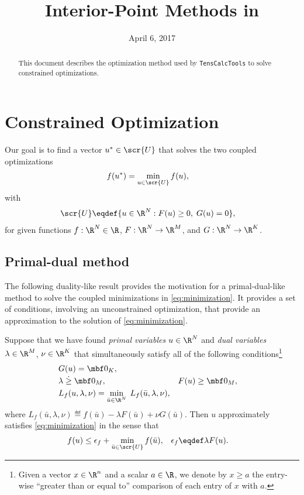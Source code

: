 \documentclass[11pt]{article}
\title{Interior-Point Methods in \TC}
\author{\jph}
\date{April 6, 2017}
\newcommand{\TC}{\texttt{TensCalcTools}}
\begin{document}
                        \maketitle

\begin{abstract}
  This document describes the optimization method used by \TC{} to
  solve constrained optimizations.
\end{abstract}

\section{Constrained Optimization}
\label{sec:ipm-o}

Our goal is to find a vector $u^*\in\scr{U}$ that solves the two coupled
optimizations
\begin{align}\label{eq:minimization}
  f(u^*)&=\min_{u\in\scr{U}} f(u), &
\end{align}
with
\begin{align*}
  \scr{U}&\eqdef\{u\in\R^{N}: F(u)\ge 0,\; G(u)=0\}, 
\end{align*}
for given functions $f:\R^{N}\in\R$, $F:\R^{N}\to\R^{M}$, and $G:\R^{N}\to\R^{K}$.


\subsection{Primal-dual method}

The following duality-like result provides the motivation for a
primal-dual-like method to solve the coupled minimizations in
\eqref{eq:minimization}. It provides a set of
conditions, involving an unconstrained optimization, that provide an
approximation to the solution of \eqref{eq:minimization}.
\begin{lemma}\label{le:minima-gap}
  Suppose that we have found \emph{primal variables} $u\in\R^{N}$
  and \emph{dual variables} $\lambda\in\R^{M}$, $\nu\in\R^{K}$ that
  simultaneously satisfy all of the following
  conditions\footnote{Given a vector $x\in\R^n$ and a scalar $a\in\R$, we
    denote by $x\ge a$ the entry-wise ``greater than or equal to''
    comparison of each entry of $x$ with $a$.}
  \begin{subequations}
    \begin{align}
      \label{eq:equality-constraints}
      &G(u)=\mbf 0_K, \\
      \label{eq:inequality-constraints}
      &\lambda\;\dot\ge\;\mbf 0_M, & &F(u)\ge\mbf 0_M,\\
      \label{eq:central-points}
      &L_f(u,\lambda,\nu) =\min_{\bar u\in\R^{N}}\; L_f(\bar u,\lambda,\nu), 
    \end{align}
  \end{subequations}
  where $L_f(\bar u,\lambda,\nu)\eqdef f(\bar u)-\lambda F(\bar u)+\nu G(\bar u)$.  Then $u$ approximately
  satisfies \eqref{eq:minimization} in the sense that
  \begin{align}\label{eq:epsilon-equilibria-o}
    f(u)&\le\epsilon_f+\min_{\bar u\in\scr{U}} f(\bar u), &
    \epsilon_f&\eqdef \lambda F(u).
  \end{align}
  \frqed
\end{lemma}
\end{document}
